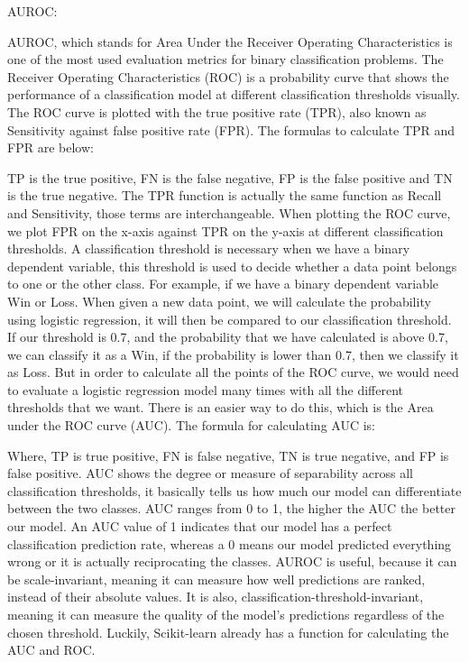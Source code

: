 \documentclass[a4paper,12pt]{report}
\begin{document}
AUROC:

AUROC, which stands for Area Under the Receiver Operating Characteristics is one of the most used evaluation metrics for binary classification problems. The Receiver Operating Characteristics (ROC) is a probability curve that shows the performance of a classification model at different classification thresholds visually. The ROC curve is plotted with the true positive rate (TPR), also known as Sensitivity against false positive rate (FPR). The formulas to calculate TPR and FPR are below:

  

TP is the true positive, FN is the false negative, FP is the false positive and TN is the true negative. The TPR function is actually the same function as Recall and Sensitivity, those terms are interchangeable. When plotting the ROC curve, we plot FPR on the x-axis against TPR on the y-axis at different classification thresholds. A classification threshold is necessary when we have a binary dependent variable, this threshold is used to decide whether a data point belongs to one or the other class. For example, if we have a binary dependent variable Win or Loss. When given a new data point, we will calculate the probability using logistic regression, it will then be compared to our classification threshold. If our threshold is 0.7, and the probability that we have calculated is above 0.7, we can classify it as a Win, if the probability is lower than 0.7, then we classify it as Loss. But in order to calculate all the points of the ROC curve, we would need to evaluate a logistic regression model many times with all the different thresholds that we want. There is an easier way to do this, which is the Area under the ROC curve (AUC). The formula for calculating AUC is:


Where, TP is true positive, FN is false negative, TN is true negative, and FP is false positive. AUC shows the degree or measure of separability across all classification thresholds, it basically tells us how much our model can differentiate between the two classes. AUC ranges from 0 to 1, the higher the AUC the better our model. An AUC value of 1 indicates that our model has a perfect classification prediction rate, whereas a 0 means our model predicted everything wrong or it is actually reciprocating the classes. AUROC is useful, because it can be scale-invariant, meaning it can measure how well predictions are ranked, instead of their absolute values. It is also, classification-threshold-invariant, meaning it can measure the quality of the model’s predictions regardless of the chosen threshold. Luckily, Scikit-learn already has a function for calculating the AUC and ROC.     
\end{document}
